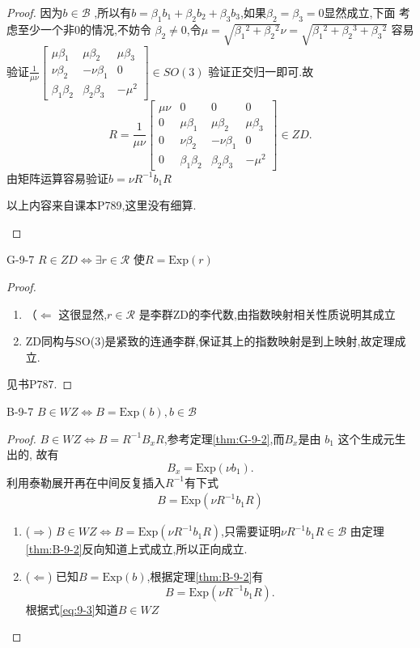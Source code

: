 \documentclass[../main.tex]{subfiles}
\begin{document}
\begin{proof}
  因为$b \in \mathscr{B}$ ,所以有$b = \beta_1b_1 + \beta_2b_2 + \beta_3b_3$,如果$\beta_2 = \beta_3 = 0$显然成立,下面
  考虑至少一个非0的情况,不妨令 $\beta_2 \neq 0$,令$\mu = \sqrt{\beta_{1}{}^{2} + \beta_{2}{}^{2}} \nu = \sqrt{\beta_{1}{}^{2} + \beta_{2}{}^{3} + \beta_{3}{}^{2}} $
  容易验证$
  \frac{1}{\mu\nu}\begin{bmatrix} \mu \beta_1 & \mu \beta_2 & \mu \beta_3\\ \nu \beta_2 & - \nu \beta_1 & 0 \\ \beta_1\beta_2 &\beta_2 \beta_3 & - \mu^2\end{bmatrix} \in SO(3)$
  验证正交归一即可.故\[
    R = \frac{1}{\mu\nu}\begin{bmatrix} \mu \nu & 0&0&0\\ 0& \mu \beta_1 & \mu \beta_2 & \mu \beta_3\\ 0&\nu \beta_2 & - \nu \beta_1 & 0 \\ 0&\beta_1\beta_2 &\beta_2 \beta_3 & - \mu^2\end{bmatrix} \in ZD 
  .\] 
  由矩阵运算容易验证$b = \nu R^{-1} b_1 R$
  \begin{note}
    以上内容来自课本P789,这里没有细算.
  \end{note}
\end{proof}
\begin{theorem}
  {}{G-9-7}
  $R \in ZD \Leftrightarrow \exists r \in \mathscr{R} $ 使$R = \text{Exp}(r)$
\end{theorem}
\begin{proof}
 \begin{enumerate}
   \item （$\Leftarrow$ 这很显然,$r \in \mathscr{R}$ 是李群ZD的李代数,由指数映射相关性质说明其成立
   \item ZD同构与SO(3)是紧致的连通李群,保证其上的指数映射是到上映射,故定理成立.
 \end{enumerate} 
 见书P787.
\end{proof}
\begin{theorem}
  {}{B-9-7}
  $B \in WZ \Leftrightarrow B = \text{Exp}(b), b \in \mathscr{B}$
\end{theorem}
\begin{proof}
  $B \in  WZ \Leftrightarrow B = R^{-1} B_x R$,参考定理\ref{thm:G-9-2},而$B_x$是由 $b_1$ 这个生成元生出的,
  故有\[
  B_x = \text{Exp}(\nu b_1)
  .\] 
利用泰勒展开再在中间反复插入$R^{-1}$有下式
\begin{align}
  B = \text{Exp}(\nu R^{-1} b_1 R)
  \label{eq:9-3} 
\end{align}
\begin{enumerate}
  \item ($\Rightarrow$)  $B \in WZ \Leftrightarrow B = \text{Exp}(\nu R^{-1} b_1 R)$,只需要证明$\nu R^{-1} b_1 R \in \mathscr{B}$ 由定理\ref{thm:B-9-2}反向知道上式成立,所以正向成立.
  \item ($\Leftarrow$) 已知$B = \text{Exp}(b)$,根据定理\ref{thm:B-9-2}有\[
 B = \text{Exp} (\nu R^{-1} b_1 R)
  .\]
  根据式\ref{eq:9-3}知道$B \in WZ$
\end{enumerate}
\end{proof}
\end{document}
